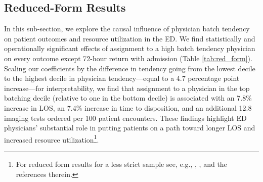 \documentclass[,,nonblindrev]{informs}
\begin{document}
\subsection{Reduced-Form Results}\label{sec:reducedform}

In this sub-section, we explore the causal influence of physician batch
tendency on patient outcomes and resource utilization in the ED. We find
statistically and operationally significant effects of assignment to a
high batch tendency physician on every outcome except 72-hour return
with admission (Table \ref{tab:red_form}). Scaling our coefficients by
the difference in tendency going from the lowest decile to the highest
decile in physician tendency---equal to a 4.7 percentage point
increase---for interpretability, we find that assignment to a physician
in the top batching decile (relative to one in the bottom decile) is
associated with an 7.8\% increase in LOS, an 7.4\% increase in time to
disposition, and an additional 12.8 imaging tests ordered per 100
patient encounters. These findings highlight ED physicians' substantial
role in putting patients on a path toward longer LOS and increased
resource
utilization\footnote{For reduced form results for a less strict sample see, e.g., \cite{jameson2024variation}, \cite{hodgson2018are}, and the references therein.}.
\end{document}
